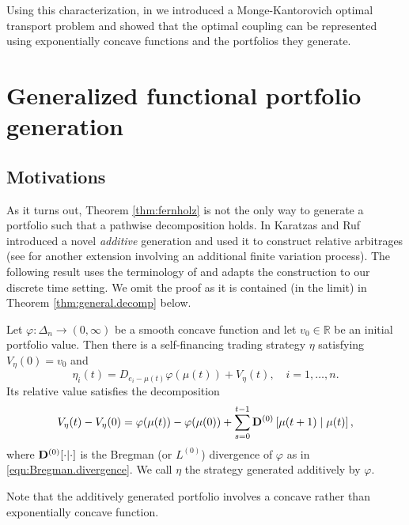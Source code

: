 \documentclass[graybox]{svmult}
\begin{document}
Using this characterization, in \cite{PW15} we introduced a Monge-Kantorovich optimal transport problem and showed that the optimal coupling can be represented using exponentially concave functions and the portfolios they generate.

\section{Generalized functional portfolio generation} \label{sec:general.portfolio}
\subsection{Motivations}
As it turns out, Theorem \ref{thm:fernholz} is not the only way to generate a portfolio such that a pathwise decomposition holds. In \cite{KR17} Karatzas and Ruf introduced a novel {\it additive} generation and used it to construct relative arbitrages (see \cite{RX18} for another extension involving an additional finite variation process). The following result uses the terminology of \cite[Section 3.3]{V16} and adapts the construction to our discrete time setting. We omit the proof as it is contained (in the limit) in Theorem \ref{thm:general.decomp} below.

\begin{theorem}  \label{thm:additive.portfolio}
Let $\varphi: \Delta_n \rightarrow (0, \infty)$ be a smooth concave function and let $v_0 \in \mathbb{R}$ be an initial portfolio value. Then there is a self-financing trading strategy $\eta$ satisfying $V_{\eta}(0) = v_0$ and
\begin{equation} \label{eqn:additive.portfolio}
\eta_i (t) = D_{e_i - \mu(t)} \varphi(\mu(t)) + V_{\eta}(t), \quad i = 1, \ldots, n.
\end{equation}
Its relative value satisfies the decomposition
\begin{equation} \label{eqn:additive.decomp}
V_{\eta}(t) - V_{\eta}(0) = \varphi(\mu(t)) - \varphi(\mu(0)) + \sum_{s = 0}^{t - 1} {\bf D}^{(0)}  \left[\mu(t + 1) \mid \mu(t) \right],
\end{equation}
where ${\bf D}^{(0)}[ \cdot | \cdot]$ is the Bregman (or $L^{(0)}$) divergence of $\varphi$ as in \eqref{eqn:Bregman.divergence}. We call $\eta$ the strategy generated additively by $\varphi$.
\end{theorem}

Note that the additively generated portfolio involves a concave rather than exponentially concave function.
\end{document}
